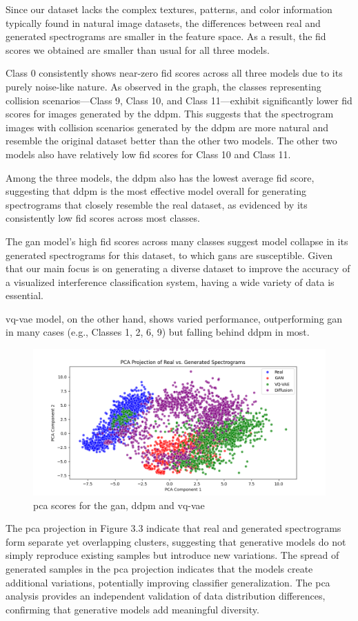 Since our dataset lacks the complex textures, patterns, and color information typically found in natural image datasets, the differences between real and generated spectrograms are smaller in the feature space. As a result, the \gls{fid} scores we obtained are smaller than usual for all three models.

Class 0 consistently shows near-zero \gls{fid} scores across all three models due to its purely noise-like nature. As observed in the graph, the classes representing collision scenarios—Class 9, Class 10, and Class 11—exhibit significantly lower \gls{fid} scores for images generated by the \gls{ddpm}. This suggests that the spectrogram images with collision scenarios generated by the \gls{ddpm} are more natural and resemble the original dataset better than the other two models. The other two models also have relatively low \gls{fid} scores for Class 10 and Class 11.

Among the three models, the \gls{ddpm} also has the lowest average \gls{fid} score, suggesting that \gls{ddpm} is the most effective model overall for generating spectrograms that closely resemble the real dataset, as evidenced by its consistently low \gls{fid} scores across most classes.

The \gls{gan} model's high \gls{fid} scores across many classes suggest model collapse in its generated spectrograms for this dataset, to which \gls{gan}s are susceptible. Given that our main focus is on generating a diverse dataset to improve the accuracy of a visualized interference classification system, having a wide variety of data is essential.

\gls{vq-vae} model, on the other hand, shows varied performance, outperforming \gls{gan} in many cases (e.g., Classes 1, 2, 6, 9) but falling behind \gls{ddpm} in most.

\begin{figure}[h]
\includegraphics[width=\textwidth]{figures/PCA (1).png}
\centering
\caption{ \gls{pca} scores for the \gls{gan}, \gls{ddpm} and \gls{vq-vae}}
\centering
\end{figure}
The \gls{pca} projection in Figure 3.3 indicate that real and generated spectrograms form separate yet overlapping clusters, suggesting that generative models do not simply reproduce existing samples but introduce new variations. The spread of generated samples in the \gls{pca} projection indicates that the models create additional variations, potentially improving classifier generalization. The \gls{pca} analysis provides an independent validation of data distribution differences, confirming that generative models add meaningful diversity.

